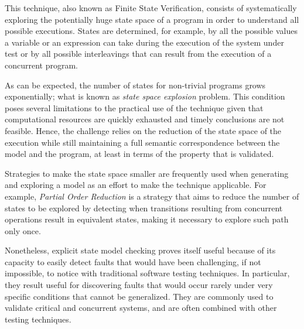 
\label{subsec:explicit-state-model-checking}

This technique, also known as Finite State Verification, consists of systematically exploring the potentially huge state space of a program in order to understand all possible executions. States are determined, for example, by all the possible values a variable or an expression can take during the execution of the system under test or by all possible interleavings that can result from the execution of a concurrent program. 

As can be expected, the number of states for non-trivial programs grows exponentially; what is known as \textit{state space explosion} problem. This condition poses several limitations to the practical use of the technique given that computational resources are quickly exhausted and timely conclusions are not feasible. Hence, the challenge relies on the reduction of the state space of the execution while still maintaining a full semantic correspondence between the model and the program, at least in terms of the property that is validated.

Strategies to make the state space smaller are frequently used when generating and exploring a model as an effort to make the technique applicable. For example, \textit{Partial Order Reduction} is a strategy that aims to reduce the number of states to be explored by detecting when transitions resulting from concurrent operations result in equivalent states, making it necessary to explore such path only once. 

Nonetheless, explicit state model checking proves itself useful because of its capacity to easily detect faults that would have been challenging, if not impossible, to notice with traditional software testing techniques. In particular, they result useful for discovering faults that would occur rarely under very specific conditions that cannot be generalized. They are commonly used to validate critical and concurrent systems, and are often combined with other testing techniques.


\label{subsec:symbolic-execution}


